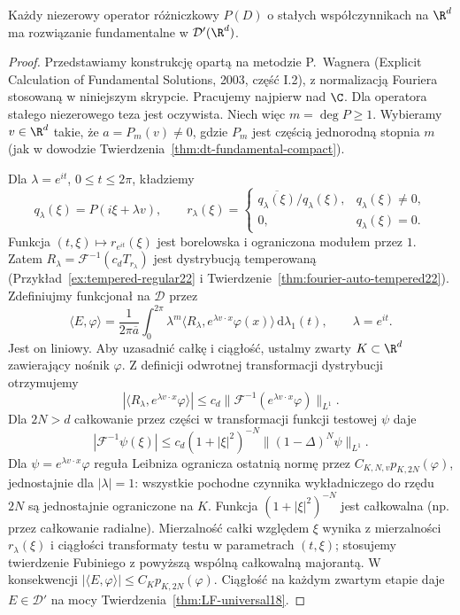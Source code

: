 \begin{twierdzenie}
\label{thm:dt-malgrange-ehrenpreis}
Każdy niezerowy operator różniczkowy $P(D)$ o stałych
współczynnikach na $\R^d$ ma rozwiązanie fundamentalne
w $\mathcal D'(\R^d)$.
\end{twierdzenie}
\begin{proof}
Przedstawiamy konstrukcję opartą na metodzie
P.~Wagnera (Explicit Calculation of Fundamental Solutions,
2003, część I.2), z normalizacją Fouriera stosowaną
w niniejszym skrypcie. Pracujemy najpierw nad $\C$.
Dla operatora stałego niezerowego teza jest oczywista.
Niech więc $m=\deg P\ge1$. Wybieramy $v\in\R^d$
takie, że $a=P_m(v)\ne0$, gdzie $P_m$ jest częścią
jednorodną stopnia $m$ (jak w dowodzie
Twierdzenia~\ref{thm:dt-fundamental-compact}).

Dla $\lambda=e^{it}$, $0\le t\le2\pi$, kładziemy
\[
 q_\lambda(\xi)=P(i\xi+\lambda v),\qquad
 r_\lambda(\xi)=
 \begin{cases}
 \overline{q_\lambda(\xi)}/q_\lambda(\xi),
 &q_\lambda(\xi)\ne0,\\
 0,&q_\lambda(\xi)=0.
 \end{cases}
\]
Funkcja $(t,\xi)\mapsto r_{e^{it}}(\xi)$ jest
borelowska i ograniczona modułem przez $1$.
Zatem $R_\lambda=\mathcal F^{-1}(c_d T_{r_\lambda})$
jest dystrybucją temperowaną
(Przykład~\ref{ex:tempered-regular22} i
Twierdzenie~\ref{thm:fourier-auto-tempered22}).
Zdefiniujmy funkcjonał na $\mathcal D$ przez
\[
 \langle E,\varphi\rangle
 =\frac{1}{2\pi\overline a}\int_0^{2\pi}
 \lambda^m\langle R_\lambda,
             e^{\lambda v\cdot x}\varphi(x)\rangle\,
 \mathrm d\lambda_1(t),\qquad \lambda=e^{it}.
\]
Jest on liniowy. Aby uzasadnić całkę i ciągłość,
ustalmy zwarty $K\subset\R^d$ zawierający nośnik
$\varphi$. Z definicji odwrotnej transformacji
dystrybucji otrzymujemy
\[
 |\langle R_\lambda,e^{\lambda v\cdot x}\varphi\rangle|
 \le c_d\|\mathcal F^{-1}
            (e^{\lambda v\cdot x}\varphi)\|_{L^1}.
\]
Dla $2N>d$ całkowanie przez części w transformacji
funkcji testowej $\psi$ daje
\[
 |\mathcal F^{-1}\psi(\xi)|
 \le c_d(1+|\xi|^2)^{-N}
       \|(1-\Delta)^N\psi\|_{L^1}.
\]
Dla $\psi=e^{\lambda v\cdot x}\varphi$ reguła Leibniza
ogranicza ostatnią normę przez $C_{K,N,v}p_{K,2N}(\varphi)$,
jednostajnie dla $|\lambda|=1$: wszystkie pochodne
czynnika wykładniczego do rzędu $2N$ są jednostajnie
ograniczone na $K$. Funkcja $(1+|\xi|^2)^{-N}$
jest całkowalna (np. przez całkowanie radialne).
Mierzalność całki względem $\xi$ wynika z mierzalności
$r_\lambda(\xi)$ i ciągłości transformaty testu
w parametrach $(t,\xi)$; stosujemy twierdzenie Fubiniego
z powyższą wspólną całkowalną majorantą.
W konsekwencji
$|\langle E,\varphi\rangle|\le C_Kp_{K,2N}(\varphi)$.
Ciągłość na każdym zwartym etapie daje
$E\in\mathcal D'$ na mocy
Twierdzenia~\ref{thm:LF-universal18}.


\end{proof}
